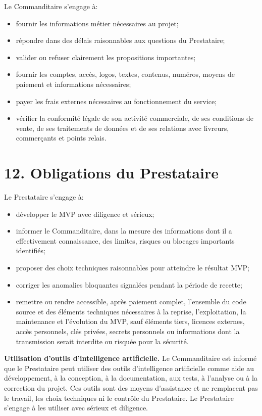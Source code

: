 \documentclass[11pt,a4paper]{article}
\begin{document}
Le Commanditaire s'engage à:

\begin{itemize}
    \item fournir les informations métier nécessaires au projet;
    \item répondre dans des délais raisonnables aux questions du Prestataire;
    \item valider ou refuser clairement les propositions importantes;
    \item fournir les comptes, accès, logos, textes, contenus, numéros, moyens de paiement et informations nécessaires;
    \item payer les frais externes nécessaires au fonctionnement du service;
    \item vérifier la conformité légale de son activité commerciale, de ses conditions de vente, de ses traitements de données et de ses relations avec livreurs, commerçants et points relais.
\end{itemize}

\section*{12. Obligations du Prestataire}

Le Prestataire s'engage à:

\begin{itemize}
    \item développer le MVP avec diligence et sérieux;
    \item informer le Commanditaire, dans la mesure des informations dont il a effectivement connaissance, des limites, risques ou blocages importants identifiés;
    \item proposer des choix techniques raisonnables pour atteindre le résultat MVP;
    \item corriger les anomalies bloquantes signalées pendant la période de recette;
    \item remettre ou rendre accessible, après paiement complet, l'ensemble du code source et des éléments techniques nécessaires à la reprise, l'exploitation, la maintenance et l'évolution du MVP, sauf éléments tiers, licences externes, accès personnels, clés privées, secrets personnels ou informations dont la transmission serait interdite ou risquée pour la sécurité.
\end{itemize}

\textbf{Utilisation d'outils d'intelligence artificielle.} Le Commanditaire est informé que le Prestataire peut utiliser des outils d'intelligence artificielle comme aide au développement, à la conception, à la documentation, aux tests, à l'analyse ou à la correction du projet. Ces outils sont des moyens d'assistance et ne remplacent pas le travail, les choix techniques ni le contrôle du Prestataire. Le Prestataire s'engage à les utiliser avec sérieux et diligence.
\end{document}
